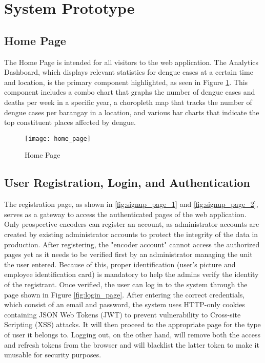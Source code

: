 \section{System Prototype}
\subsection{Home Page}
The Home Page is intended for all visitors to the web application. The Analytics Dashboard, which displays relevant statistics for dengue cases at a certain time and location, is the primary component highlighted, as seen in Figure \ref{fig:home_page}. This component includes a combo chart that graphs the number of dengue cases and deaths per week in a specific year, a choropleth map that tracks the number of dengue cases per barangay in a location, and various bar charts that indicate the top constituent places affected by dengue. 

\begin{figure}[H]
	\centering
	\texttt{[image: home\_page]}
	\caption{Home Page}
	\label{fig:home_page}
\end{figure}

\subsection{User Registration, Login, and Authentication}
The registration page, as shown in \ref{fig:signup_page_1} and \ref{fig:signup_page_2}, serves as a gateway to access the authenticated pages of the web application. Only prospective encoders can register an account, as administrator accounts are created by existing administrator accounts to protect the integrity of the data in production. After registering, the "encoder account" cannot access the authorized pages yet as it needs to be verified first by an administrator managing the unit the user entered. Because of this, proper identification (user's picture and employee identification card) is mandatory to help the admins verify the identity of the registrant. Once verified, the user can log in to the system through the page shown in Figure \ref{fig:login_page}. After entering the correct credentials, which consist of an email and password, the system uses HTTP-only cookies containing JSON Web Tokens (JWT) to prevent vulnerability to Cross-site Scripting (XSS) attacks. It will then proceed to the appropriate page for the type of user it belongs to. Logging out, on the other hand, will remove both the access and refresh tokens from the browser and will blacklist the latter token to make it unusable for security purposes. 


